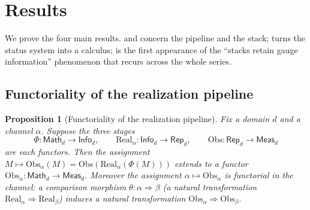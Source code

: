 \documentclass[12pt]{article}
\newtheorem{proposition}[theorem]{Proposition}
\theoremstyle{definition}
\theoremstyle{remark}
\newcommand{\Math}{\mathsf{Math}}
\newcommand{\Info}{\mathsf{Info}}
\newcommand{\Rep}{\mathsf{Rep}}
\newcommand{\Meas}{\mathsf{Meas}}
\newcommand{\Real}{\mathrm{Real}}
\newcommand{\Obs}{\mathrm{Obs}}
\begin{document}
\section{Results}
\label{sec:results}

We prove the four main results.  and 
concern the pipeline and the stack;  turns the status system
into a calculus;  is the first appearance of the ``stacks
retain gauge information'' phenomenon that recurs across the whole series.

\subsection{Functoriality of the realization pipeline}

\begin{proposition}[Functoriality of the realization pipeline]
\label{thm:functorial}
Fix a domain $d$ and a channel $\alpha$. Suppose the three stages
\[
  \Phi : \Math_d \to \Info_d, \qquad
  \Real_\alpha : \Info_d \to \Rep_d, \qquad
  \Obs : \Rep_d \to \Meas_d
\]
are each functors. Then the assignment
$M \mapsto \Obs_\alpha(M) = \Obs(\Real_\alpha(\Phi(M)))$ extends to a functor
$\Obs_\alpha : \Math_d \to \Meas_d$. Moreover the assignment
$\alpha \mapsto \Obs_\alpha$ is functorial in the channel: a comparison
morphism $\theta : \alpha \Rightarrow \beta$ (a natural transformation
$\Real_\alpha \Rightarrow \Real_\beta$) induces a natural transformation
$\Obs_\alpha \Rightarrow \Obs_\beta$.
\end{proposition}
\end{document}
